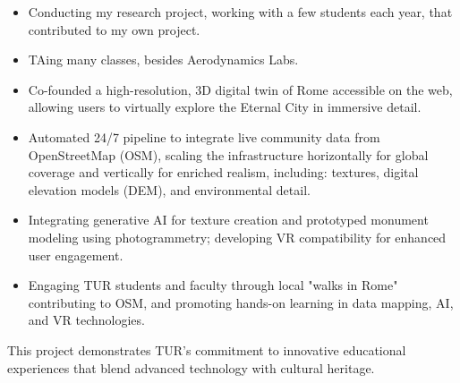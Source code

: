 	\divider

	\newline
	\begin{itemize}
		\item Conducting my research project, working with a few students each year, that contributed to my own project.
		\item TAing many classes, besides Aerodynamics Labs.
	\end{itemize}
	\smallskip

	\medskip


	\switchcolumn
\fi

\iflongversion

	\newline
	\begin{itemize}
		\item Co-founded a high-resolution, 3D digital twin of Rome accessible on the web, allowing users to virtually explore the Eternal City in immersive detail.
		\item Automated 24/7 pipeline to integrate live community data from OpenStreetMap (OSM), scaling the infrastructure horizontally for global coverage and vertically for enriched realism, including: textures, digital elevation models (DEM), and environmental detail.
		\item Integrating generative AI for texture creation and prototyped monument modeling using photogrammetry; developing VR compatibility for enhanced user engagement.
		\item Engaging TUR students and faculty through local "walks in Rome" contributing to OSM, and promoting hands-on learning in data mapping, AI, and VR technologies.
	\end{itemize}
	\smallskip
	This project demonstrates TUR's commitment to innovative educational experiences that blend advanced technology with cultural heritage. \\
	\smallskip

